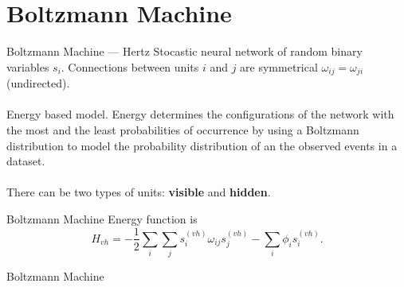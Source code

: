 \section{Boltzmann Machine}

\begin{frame}{Boltzmann Machine --- Hertz}%
    \justifying%
    Stocastic neural network of random binary variables $s_{i}$. Connections between units $i$ and $j$ are symmetrical $\omega_{ij} = \omega_{ji}$ (undirected).
    \\~\\
    Energy based model. Energy determines the configurations of the network with the most and the least probabilities of occurrence by using a Boltzmann distribution to model the probability distribution of an the observed events in a dataset.
    \\~\\
    There can be two types of units: \textbf{visible} and \textbf{hidden}.
       
\end{frame}

\begin{frame}{Boltzmann Machine}
    \justifying%
    Energy function is
    \begin{equation}
        \label{eq:energy-function-bm}
        H_{vh} = -\frac{1}{2} \sum_{i}\sum_{j} s^{(vh)}_{i} \omega_{ij} s^{(vh)}_{j} - \sum_{i} \phi_{i} s^{(vh)}_{i}.
    \end{equation}
\end{frame}

\begin{frame}{Boltzmann Machine}%
  \justifying%
  \\~\\
  \\~\\
\end{frame}

